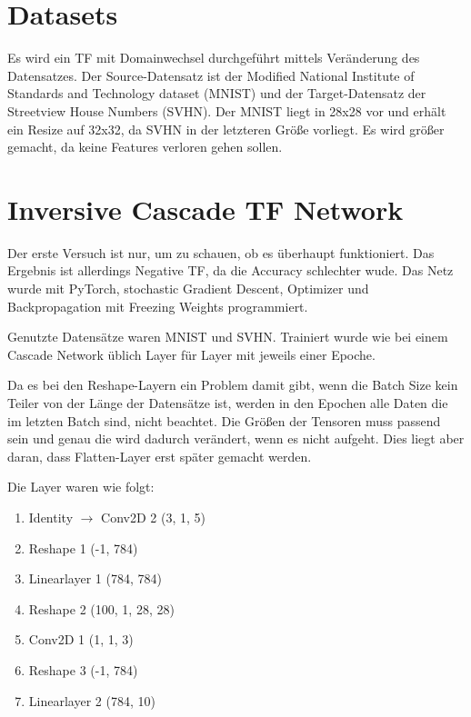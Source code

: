 \section{Datasets}

    Es wird ein TF mit Domainwechsel durchgeführt mittels Veränderung des 
    Datensatzes. Der Source-Datensatz ist der Modified National Institute 
    of Standards and Technology dataset (MNIST) und der Target-Datensatz 
    der Streetview House Numbers (SVHN). Der MNIST liegt in 28x28 vor und 
    erhält ein Resize auf 32x32, da SVHN in der letzteren Größe vorliegt. 
    Es wird größer gemacht, da keine Features verloren gehen sollen.

\section{Inversive Cascade TF Network}

    Der erste Versuch ist nur, um zu schauen, ob es überhaupt funktioniert. 
    Das Ergebnis ist allerdings Negative TF, da die Accuracy schlechter wude. 
    Das Netz wurde mit PyTorch, stochastic Gradient Descent, Optimizer und 
    Backpropagation mit Freezing Weights programmiert. 

    Genutzte Datensätze waren MNIST und SVHN. Trainiert wurde wie bei einem 
    Cascade Network üblich Layer für Layer mit jeweils einer Epoche.

    Da es bei den Reshape-Layern ein Problem damit gibt, wenn die Batch Size kein Teiler 
    von der Länge der Datensätze ist, werden in den Epochen alle Daten die im letzten Batch 
    sind, nicht beachtet. Die Größen der Tensoren muss passend sein und genau die wird 
    dadurch verändert, wenn es nicht aufgeht. Dies liegt aber daran, dass Flatten-Layer 
    erst später gemacht werden.

    Die Layer waren wie folgt: 
    \begin{enumerate}
        \item Identity $\rightarrow$ Conv2D 2 (3, 1, 5)
        \item Reshape 1 (-1, 784)
        \item Linearlayer 1 (784, 784)
        \item Reshape 2 (100, 1, 28, 28)
        \item Conv2D 1 (1, 1, 3)
        \item Reshape 3 (-1, 784)
        \item Linearlayer 2 (784, 10)
    \end{enumerate}

